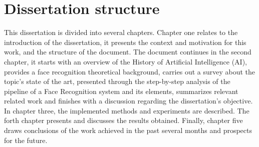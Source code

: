 \documentclass[class=report, crop=false, a4paper, 12pt]{standalone}
\begin{document}
\section{Dissertation structure}
\par This dissertation is divided into several chapters. Chapter one relates to the introduction of the dissertation, it presents the context and motivation for this work, and the structure of the document. The document continues in the second chapter, it starts with an overview of the History of Artificial Intelligence (AI), provides a face recognition theoretical background, carries out a survey about the topic's state of the art, presented through the step-by-step analysis of the pipeline of a Face Recognition system and its elements, summarizes relevant related work and finishes with a discussion regarding the dissertation's objective. In chapter three, the implemented methods and experiments are described. The forth chapter presents and discusses the results obtained. Finally, chapter five draws conclusions of the work achieved in the past several months and prospects for the future.
\end{document}

